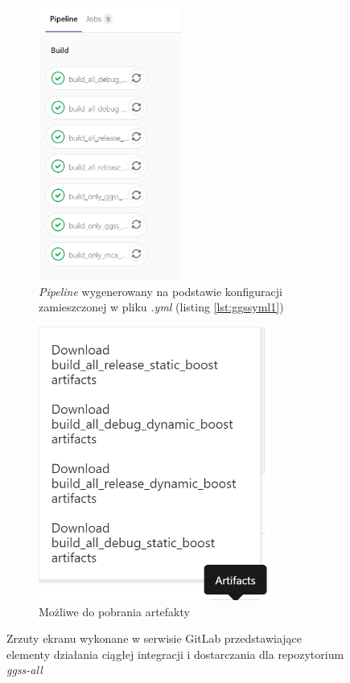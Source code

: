 \begin{figure}[H]
\centering

\begin{subfigure}{0.4\textwidth}
\centering
\includegraphics[height=9cm]{res/png/runnerPipeline}
\caption{\textit{Pipeline} wygenerowany na podstawie konfiguracji zamieszczonej w pliku \textit{.yml} (listing \ref{lst:ggssyml1})}
\end{subfigure}
\hspace{0.5cm}
\begin{subfigure}{0.4\textwidth}
\centering
\includegraphics[height=9cm]{res/png/runnerArtifacts}
\caption{Możliwe do pobrania artefakty}
\end{subfigure}

\caption{Zrzuty ekranu wykonane w serwisie GitLab przedstawiające elementy działania ciągłej integracji i dostarczania dla repozytorium \textit{ggss-all}}
\label{fig:pipelineall}

\end{figure}

